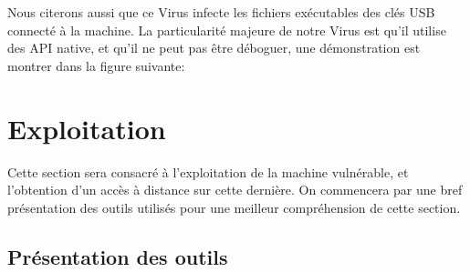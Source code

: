     Nous citerons aussi que ce Virus infecte les fichiers exécutables des clés USB connecté à la machine.
    La particularité majeure de notre Virus est qu’il utilise des API native, et qu’il ne peut pas être 
    déboguer, une démonstration est montrer dans la figure suivante:

\section{Exploitation} \label{exploitation}
Cette section sera consacré à l'exploitation de la machine vulnérable, et l'obtention d'un accès à distance
sur cette dernière. On commencera par une bref présentation des outils utilisés pour une meilleur compréhension
de cette section.
    \subsection{Présentation des outils}
